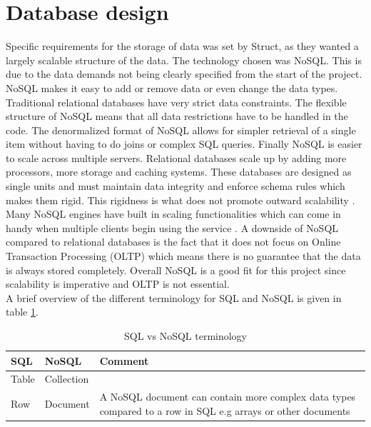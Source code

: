 \section{Database design}
Specific requirements for the storage of data was set by \gls{Struct}, as they wanted a largely scalable structure of the data. The technology chosen was \gls{NoSQL}.
This is due to the data demands not being clearly specified from the start of the project. \gls{NoSQL} makes it easy to add or remove data or even change the data types. Traditional relational databases have very strict data constraints. The flexible structure of \gls{NoSQL} means that all data restrictions have to be handled in the code. The denormalized format of \gls{NoSQL} allows for simpler retrieval of a single item without having to do joins or complex SQL queries. Finally \gls{NoSQL} is easier to scale across multiple servers. Relational databases scale up by adding more processors, more storage and caching systems. These databases are designed as single units and must maintain data integrity and enforce schema rules which makes them rigid. This rigidness is what does not promote outward scalability \cite{NoSQLScalability}.  Many \gls{NoSQL} engines have built in scaling functionalities which can come in handy when multiple clients begin using the service \cite{SQLvsNOSQL}. A downside of \gls{NoSQL} compared to relational databases is the fact that it does not focus on Online Transaction Processing (OLTP) which means there is no guarantee that the data is always stored completely. Overall \gls{NoSQL} is a good fit for this project since scalability is imperative and OLTP is not essential.\\
A brief overview of the different terminology for SQL and \gls{NoSQL} is given in table \ref{sqlvsnosql_table}.
\begin{table}[H]
	\centering
	\caption{SQL vs \gls{NoSQL} terminology}
	\label{sqlvsnosql_table}
	\begin{tabular}{|l|l|p{8cm}|}
		\hline
		\textbf{SQL}   & \textbf{\gls{NoSQL}}     & \textbf{Comment}                                                                                                    \\ \hline
		Table & Collection &                                                                                                            \\ \hline
		Row   & Document   & A \gls{NoSQL} document can contain more complex data types compared to a row in SQL e.g arrays or other documents \\
		\hline
	\end{tabular}
\end{table}

